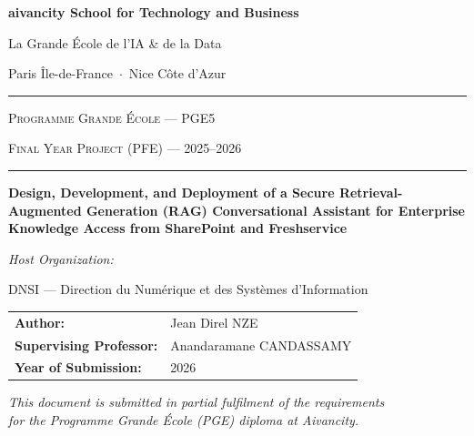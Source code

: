 \documentclass[12pt,a4paper,oneside]{report}
\begin{document}
\hypersetup{pageanchor=false}
\begin{titlepage}
\thispagestyle{empty}
\centering

\vspace*{0.2cm}
{\Large\bfseries aivancity School for Technology and Business\par}
\vspace{0.25cm}
{\large La Grande École de l'IA \& de la Data\par}
\vspace{0.18cm}
{\normalsize Paris Île-de-France \,$\cdot$\, Nice Côte d'Azur\par}

\vspace{0.8cm}
\rule{0.86\textwidth}{0.6pt}\par
\vspace{0.25cm}
{\large\scshape Programme Grande École --- PGE5\par}
\vspace{0.12cm}
{\large\scshape Final Year Project (PFE) --- 2025--2026\par}
\vspace{0.25cm}
\rule{0.86\textwidth}{0.6pt}\par

\vspace{1.15cm}
{\fontsize{20}{25}\selectfont\bfseries
Design, Development, and Deployment of a Secure Retrieval-Augmented Generation (RAG) Conversational Assistant for Enterprise Knowledge Access from SharePoint and Freshservice\par}

\vspace{0.95cm}
{\itshape Host Organization:\par}
\vspace{0.18cm}
{\large DNSI --- Direction du Numérique et des Systèmes d'Information\par}

\vspace{1.25cm}
\begin{tabular}{@{}p{4.8cm}p{8.0cm}@{}}
\textbf{Author:} & Jean Direl NZE \\[0.28cm]
\textbf{Supervising Professor:} & Anandaramane CANDASSAMY \\[0.28cm]
\textbf{Year of Submission:} & 2026 \\
\end{tabular}

\vfill

{\small\itshape
This document is submitted in partial fulfilment of the requirements\\
for the Programme Grande École (PGE) diploma at Aivancity.\par}

\end{titlepage}
\hypersetup{pageanchor=true}
\end{document}
